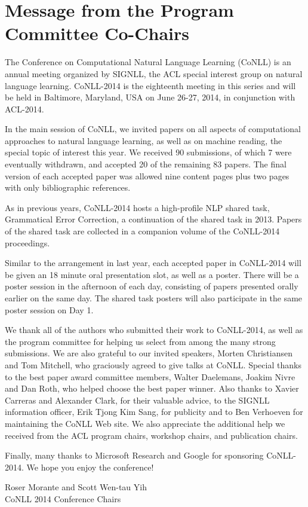 \section*{Message from the Program Committee Co-Chairs}
\thispagestyle{emptyheader}
\begin{large}

\setlength{\parskip}{.7ex}

The Conference on Computational Natural Language Learning (CoNLL) is
an annual meeting organized by SIGNLL, the ACL special interest group
on natural language learning. CoNLL-2014 is the eighteenth meeting in
this series and will be held in Baltimore, Maryland, USA on June
26-27, 2014, in conjunction with ACL-2014.

In the main session of CoNLL, we invited papers on all aspects of
computational approaches to natural language learning, as well as on
machine reading, the special topic of interest this year. We received
90 submissions, of which 7 were eventually withdrawn, and accepted 20
of the remaining 83 papers. The final version of each accepted paper
was allowed nine content pages plus two pages with only bibliographic
references.

As in previous years, CoNLL-2014 hosts a high-profile NLP shared task,
Grammatical Error Correction, a continuation of the shared task in
2013. Papers of the shared task are collected in a companion volume of
the CoNLL-2014 proceedings.

Similar to the arrangement in last year, each accepted paper in
CoNLL-2014 will be given an 18 minute oral presentation slot, as well
as a poster. There will be a poster session in the afternoon of each
day, consisting of papers presented orally earlier on the same
day. The shared task posters will also participate in the same poster
session on Day 1.

We thank all of the authors who submitted their work to CoNLL-2014, as
well as the program committee for helping us select from among the
many strong submissions. We are also grateful to our invited speakers,
Morten Christiansen and Tom Mitchell, who graciously agreed to give
talks at CoNLL. Special thanks to the best paper award committee
members, Walter Daelemans, Joakim Nivre and Dan Roth, who helped
choose the best paper winner. Also thanks to Xavier Carreras and
Alexander Clark, for their valuable advice, to the SIGNLL information
officer, Erik Tjong Kim Sang, for publicity and to Ben Verhoeven for
maintaining the CoNLL Web site. We also appreciate the additional help
we received from the ACL program chairs, workshop chairs, and
publication chairs.

Finally, many thanks to Microsoft Research and Google for sponsoring
CoNLL-2014. We hope you enjoy the conference!

\vspace{.2in}
\indent Roser Morante and Scott Wen-tau Yih\\
\indent CoNLL 2014 Conference Chairs

\end{large}


